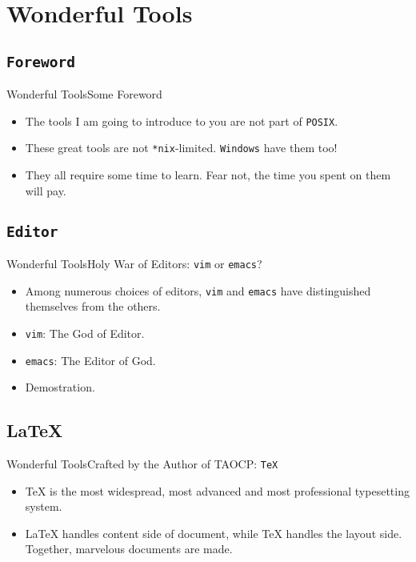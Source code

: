 \documentclass[aspectratio=169]{beamer}
\begin{document}
\section{Wonderful Tools}\label{wonderful-tools}

\subsection{\tt Foreword}
\begin{frame}{Wonderful Tools}{Some Foreword}

\begin{itemize}
\item
    The tools I am going to introduce to you are not part of \texttt{POSIX}.
\item
    These great tools are not \texttt{*nix}-limited. \texttt{Windows} have them too!
\item
    They all require some time to learn. Fear not, the time you spent on them will pay.
\end{itemize}
\end{frame}

\subsection{\tt Editor}
\begin{frame}{Wonderful Tools}{Holy War of Editors: \texttt{vim} or \texttt{emacs}?}

\begin{itemize}[<+->]
\item
  Among numerous choices of editors, \texttt{vim} and \texttt{emacs}
  have distinguished themselves from the others.
\item
  \texttt{vim}: The God of Editor.
\item
  \texttt{emacs}: The Editor of God.
\item
  Demostration.
\end{itemize}

\end{frame}

\subsection{\LaTeX{}}
\begin{frame}{Wonderful Tools}{Crafted by the Author of TAOCP: \texttt{TeX}}

\begin{itemize}
\item
  \TeX{} is the most widespread, most advanced and most
  professional typesetting system.
\item
  \LaTeX{} handles content side of document, while \TeX{}
  handles the layout side.\\
  Together, marvelous documents are made.
\end{itemize}

\end{frame}
\end{document}
